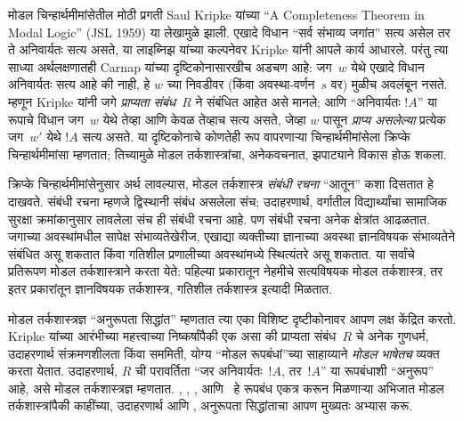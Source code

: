 \documentclass[../../../include/open-logic-section]{subfiles}
\begin{document}
मोडल चिन्हार्थमीमांसेतील मोठी प्रगती Saul Kripke यांच्या
``A Completeness Theorem in Modal Logic'' (JSL 1959) या
लेखामुळे झाली. एखादे विधान ``सर्व संभाव्य जगांत'' सत्य
असेल तर ते अनिवार्यतः सत्य असते, या लाइब्निझ यांच्या कल्पनेवर
Kripke यांनी आपले कार्य आधारले. परंतु त्या साध्या अर्थलक्षणातही
Carnap यांच्या दृष्टिकोनासारखीच अडचण आहे: जग~$w$ येथे एखादे
विधान अनिवार्यतः सत्य आहे की नाही, हे $w$ च्या निवडीवर
(किंवा अवस्था-वर्णन~$s$ वर) मुळीच अवलंबून नसते.
म्हणून Kripke यांनी जगे \emph{प्राप्यता संबंध}~$R$ ने
संबंधित आहेत असे मानले; आणि ``अनिवार्यतः $!A$'' या रूपाचे
विधान जग~$w$ येथे तेव्हा आणि केवळ तेव्हाच सत्य असते,
जेव्हा $w$ पासून \emph{प्राप्य असलेल्या} प्रत्येक जग~$w'$
येथे $!A$ सत्य असते. या दृष्टिकोनाचे कोणतेही रूप वापरणाऱ्या
चिन्हार्थमीमांसेला क्रिप्के चिन्हार्थमीमांसा म्हणतात;
तिच्यामुळे मोडल तर्कशास्त्रांचा, अनेकवचनात, झपाट्याने विकास
होऊ शकला.

क्रिप्के चिन्हार्थमीमांसेनुसार अर्थ लावल्यास, मोडल तर्कशास्त्र
\emph{संबंधी रचना} ``आतून'' कशा दिसतात हे दाखवते. संबंधी
रचना म्हणजे द्विस्थानी संबंध असलेला संच; उदाहरणार्थ,
वर्गातील विद्यार्थ्यांचा सामाजिक सुरक्षा क्रमांकानुसार
लावलेला संच ही संबंधी रचना आहे. पण संबंधी रचना अनेक
क्षेत्रांत आढळतात. जगाच्या अवस्थांमधील सापेक्ष संभाव्यतेखेरीज,
एखाद्या व्यक्तीच्या ज्ञानाच्या अवस्था ज्ञानविषयक संभाव्यतेने
संबंधित असू शकतात किंवा गतिशील प्रणालीच्या अवस्थांमध्ये
स्थित्यंतरे असू शकतात. या सर्वांचे प्रतिरूपण मोडल तर्कशास्त्राने
करता येते: पहिल्या प्रकारातून नेहमीचे सत्यविषयक मोडल तर्कशास्त्र,
तर इतर प्रकारांतून ज्ञानविषयक तर्कशास्त्र, गतिशील तर्कशास्त्र
इत्यादी मिळतात.

मोडल तर्कशास्त्रज्ञ ``अनुरूपता सिद्धांत'' म्हणतात त्या एका
विशिष्ट दृष्टीकोनावर आपण लक्ष केंद्रित करतो. Kripke यांच्या
आरंभीच्या महत्त्वाच्या निष्कर्षांपैकी एक असा की प्राप्यता
संबंध~$R$ चे अनेक गुणधर्म, उदाहरणार्थ संक्रमणशीलता किंवा
सममिती, योग्य ``मोडल रूपबंधां''च्या साहाय्याने
\emph{मोडल भाषेतच} व्यक्त करता येतात. उदाहरणार्थ,
$R$ ची परावर्तिता ``जर अनिवार्यतः~$!A$, तर~$!A$'' या
रूपबंधाशी ``अनुरूप'' आहे, असे मोडल तर्कशास्त्रज्ञ म्हणतात.
, , ,  आणि~ हे रूपबंध
एकत्र करून मिळणाऱ्या अभिजात मोडल तर्कशास्त्रांपैकी
काहींच्या, उदाहरणार्थ  आणि , अनुरूपता
सिद्धांताचा आपण मुख्यतः अभ्यास करू.
\end{document}
